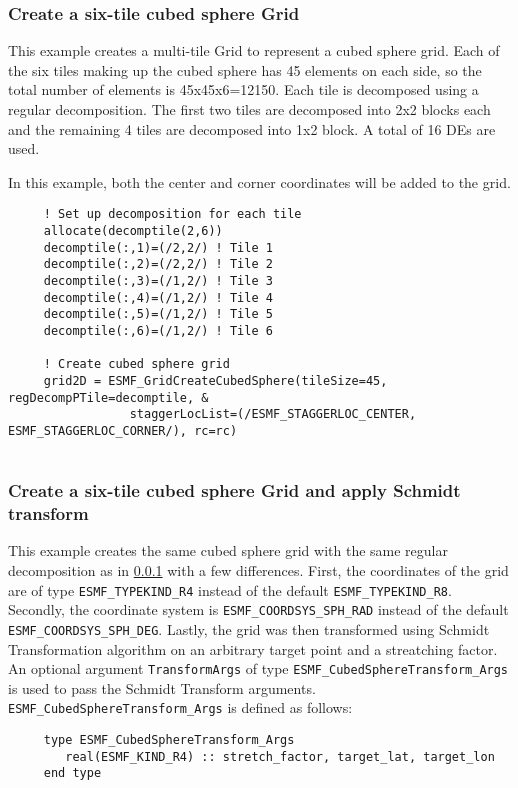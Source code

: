 
  \subsubsection{Create a six-tile cubed sphere Grid}
  \label{sec:usage:cubedsphere}
  
  This example creates a multi-tile Grid to represent a cubed sphere grid.
  Each of the six tiles making up the cubed sphere has 45 elements on
  each side, so the total number of elements is 45x45x6=12150.  Each tile is
  decomposed using a regular decomposition.  The first two tiles are decomposed into
  2x2 blocks each and the remaining 4 tiles are decomposed into 1x2 block.
  A total of 16 DEs are used.
  
  In this example, both the center and corner coordinates will be added to the grid. 

 \begin{verbatim}
     ! Set up decomposition for each tile
     allocate(decomptile(2,6))
     decomptile(:,1)=(/2,2/) ! Tile 1
     decomptile(:,2)=(/2,2/) ! Tile 2
     decomptile(:,3)=(/1,2/) ! Tile 3
     decomptile(:,4)=(/1,2/) ! Tile 4
     decomptile(:,5)=(/1,2/) ! Tile 5
     decomptile(:,6)=(/1,2/) ! Tile 6

     ! Create cubed sphere grid
     grid2D = ESMF_GridCreateCubedSphere(tileSize=45, regDecompPTile=decomptile, &
                 staggerLocList=(/ESMF_STAGGERLOC_CENTER, ESMF_STAGGERLOC_CORNER/), rc=rc)
 
\end{verbatim}
 

  \subsubsection{Create a six-tile cubed sphere Grid and apply Schmidt transform}
  \label{sec:usage:cubedspherewttransform}
  
  This example creates the same cubed sphere grid with the same regular
  decomposition as in \ref{sec:usage:cubedsphere} with a few differences.
  First, the coordinates of the grid are of type {\tt ESMF\_TYPEKIND\_R4}
  instead of the default {\tt ESMF\_TYPEKIND\_R8}. Secondly, the coordinate
  system is {\tt ESMF\_COORDSYS\_SPH\_RAD} instead of the default {\tt ESMF\_COORDSYS\_SPH\_DEG}.
  Lastly, the grid was then
  transformed using Schmidt Transformation algorithm on an arbitrary
  target point and a streatching factor.  An optional argument {\tt TransformArgs} of 
  type {\tt ESMF\_CubedSphereTransform\_Args} is used to pass the Schmidt
  Transform arguments.  {\tt ESMF\_CubedSphereTransform\_Args} is defined as
  follows:
  \begin{verbatim}
     type ESMF_CubedSphereTransform_Args
        real(ESMF_KIND_R4) :: stretch_factor, target_lat, target_lon
     end type
  \end{verbatim}
  
